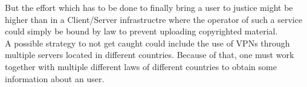 \documentclass{article}
\begin{document}
\begin{enumerate}[1]
          But the effort which has to be done to finally bring a user to justice might be higher than in a Client/Server infrastructre
          where the operator of such a service could simply be bound by law to prevent uploading copyrighted material.\\
          A possible strategy to not get caught could include the use of VPNs through multiple servers located in different countries. Because
          of that, one must work together with multiple different laws of different countries to obtain some information about an user. \\
  \end{enumerate}
\end{document}
